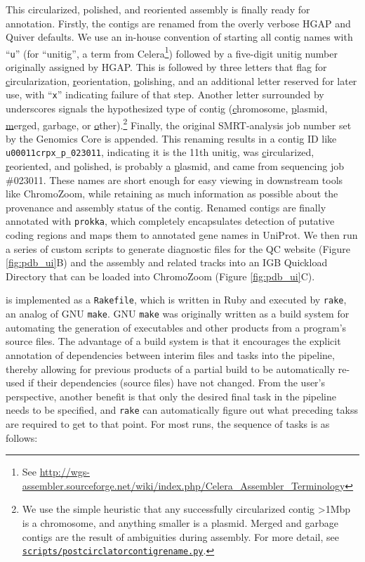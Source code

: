 This circularized, polished, and reoriented assembly is finally ready for annotation. Firstly, the contigs are renamed from the overly verbose HGAP and Quiver defaults. We use an in-house convention of starting all contig names with ``\texttt{u}'' (for ``unitig'', a term from Celera\footnote{See \url{http://wgs-assembler.sourceforge.net/wiki/index.php/Celera_Assembler_Terminology}}) followed by a five-digit unitig number originally assigned by HGAP. This is followed by three letters that flag for \underline{c}ircularization, \underline{r}eorientation, \underline{p}olishing, and an additional letter reserved for later use, with ``\texttt{x}'' indicating failure of that step. Another letter surrounded by underscores signals the hypothesized type of contig (\underline{c}hromosome, \underline{p}lasmid, \underline{m}erged, \underline{g}arbage, or \underline{o}ther).\footnote{We use the simple heuristic that any successfully circularized contig >1Mbp is a chromosome, and anything smaller is a plasmid. Merged and garbage contigs are the result of ambiguities during assembly. For more detail, see \href{https://github.com/powerpak/pathogendb-pipeline/blob/master/scripts/post\textunderscore circlator\textunderscore contig\textunderscore rename.py}{\texttt{scripts/post\textunderscore circlator\textunderscore contig\textunderscore rename.py}}.} Finally, the original SMRT-analysis job number set by the Genomics Core is appended. This renaming results in a contig ID like \verb|u00011crpx_p_023011|, indicating it is the 11th unitig, was \underline{c}ircularized, \underline{r}eoriented, and \underline{p}olished, is probably a \underline{p}lasmid, and came from sequencing job \#023011. These names are short enough for easy viewing in downstream tools like ChromoZoom, while retaining as much information as possible about the provenance and assembly status of the contig. Renamed contigs are finally annotated with \texttt{prokka},\autocite{Seemann2014} which completely encapsulates detection of putative coding regions and maps them to annotated gene names in UniProt.\autocite{Wasmuth2016} We then run a series of custom scripts to generate diagnostic files for the QC website (Figure \ref{fig:pdb_ui}B) and the assembly and related tracks into an IGB Quickload Directory that can be loaded into ChromoZoom (Figure \ref{fig:pdb_ui}C).

\pathogendbpipeline{} is implemented as a \texttt{Rakefile}, which is written in Ruby and executed by \texttt{rake}, an analog of GNU \texttt{make}. GNU \texttt{make} was originally written as a build system for automating the generation of executables and other products from a program's source files. The advantage of a build system is that it encourages the explicit annotation of dependencies between interim files and tasks into the pipeline, thereby allowing for previous products of a partial build to be automatically re-used if their dependencies (source files) have not changed. From the user's perspective, another benefit is that only the desired final task in the pipeline needs to be specified, and \texttt{rake} can automatically figure out what preceding takss are required to get to that point. For most runs, the sequence of tasks is as follows:

